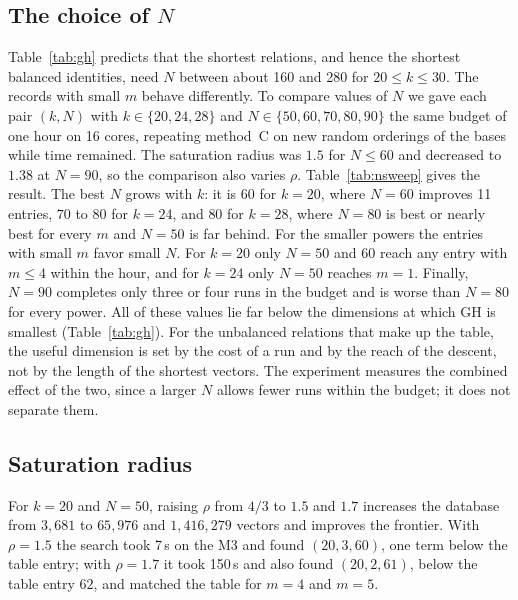 \documentclass[11pt]{amsart}
\theoremstyle{definition}
\theoremstyle{remark}
\newcommand{\GH}{\mathrm{GH}}
\begin{document}
\subsection{The choice of \texorpdfstring{$N$}{N}}\label{sec:nsweep}
Table~\ref{tab:gh} predicts that the shortest relations, and hence the shortest balanced
identities, need $N$ between about 160 and 280 for $20\le k\le30$. The records with small $m$
behave differently. To
compare values of $N$ we gave each pair $(k,N)$ with $k\in\{20,24,28\}$ and
$N\in\{50,60,70,80,90\}$ the same budget of one hour on 16 cores, repeating method~C on new
random orderings of the bases while time remained. The saturation radius was $1.5$ for
$N\le60$ and decreased to $1.38$ at $N=90$, so the comparison also varies $\rho$.
Table~\ref{tab:nsweep} gives the result.
The best $N$ grows with $k$: it is $60$ for $k=20$, where $N=60$ improves 11 entries, $70$ to $80$
for $k=24$, and $80$ for $k=28$, where $N=80$ is best or nearly best for every $m$ and $N=50$
is far behind. For the smaller powers the entries with small $m$ favor small $N$. For
$k=20$ only $N=50$ and $60$ reach any entry with $m\le4$ within the hour, and for $k=24$ only
$N=50$ reaches $m=1$. Finally, $N=90$ completes only three or four runs in the budget and is
worse than $N=80$ for every power. All of these values lie far below the dimensions at which
$\GH$ is smallest (Table~\ref{tab:gh}). For the unbalanced relations that make up the
table, the useful dimension is set by the cost of a run and by the reach of the descent, not
by the length of the shortest vectors. The experiment measures the combined effect of the two,
since a larger $N$ allows fewer runs within the budget; it does not separate them.

\begin{table}[htbp]
\centering\footnotesize
\setlength{\tabcolsep}{4pt}

\caption{Method C repeated for one hour on 16 cores for each $k$ and $N$. ``Runs'' is the
number of runs completed; ``improved'' counts entries $m\le16$ below the table, and ``$m\le4$
reached'' the entries with $m\le4$ for which an identity was found. The two gap columns give the
distance to the best $N$, $\sum_m\bigl(n_N(m)-\min_{N'}n_{N'}(m)\bigr)$ over the entries reached
at every $N$, separately for $m\le4$ and $5\le m\le16$.}\label{tab:nsweep}
\end{table}

\subsection{Saturation radius}
For $k=20$ and $N=50$, raising $\rho$ from $4/3$ to $1.5$ and $1.7$ increases the database
from $3{,}681$ to $65{,}976$ and $1{,}416{,}279$ vectors and improves the frontier. With
$\rho=1.5$ the search took 7\,s on the M3 and found $(20,3,60)$, one term below the table entry; with
$\rho=1.7$ it took 150\,s and also found $(20,2,61)$, below the table entry $62$, and matched the
table for $m=4$ and $m=5$.
\end{document}
